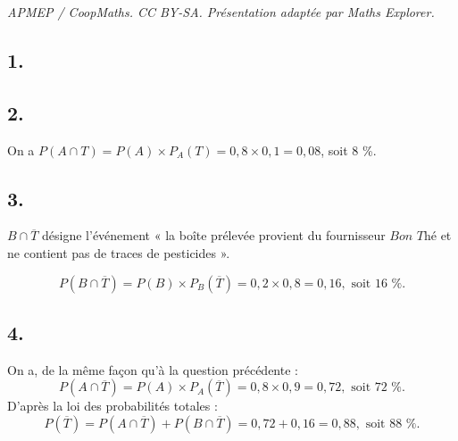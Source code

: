 \documentclass[10pt]{article}
\begin{document}
\noindent\textit{APMEP / CoopMaths. CC BY-SA. Présentation adaptée par Maths Explorer.}\par\medskip
\subsection*{1.}

\begin{center}
\end{center}

\subsection*{2.}

On a \( P(A \cap T) = P(A) \times P_A(T) = 0{,}8 \times 0{,}1 = 0{,}08 \), soit 8 \%.

\subsection*{3.}

\( B \cap \overline{T} \) désigne l'événement « la boîte prélevée provient du fournisseur \(\textit{Bon Thé}\) et ne contient pas de traces de pesticides ».

\[
P(B \cap \overline{T}) = P(B) \times P_B(\overline{T}) = 0{,}2 \times 0{,}8 = 0{,}16, \text{ soit 16 \%}.
\]

\subsection*{4.}

On a, de la même façon qu'à la question précédente :
\[
P(A \cap \overline{T}) = P(A) \times P_A(\overline{T}) = 0{,}8 \times 0{,}9 = 0{,}72, \text{ soit 72 \%}.
\]
D'après la loi des probabilités totales :
\[
P(\overline{T}) = P(A \cap \overline{T}) + P(B \cap \overline{T}) = 0{,}72 + 0{,}16 = 0{,}88, \text{ soit 88 \%}.
\]
\end{document}
